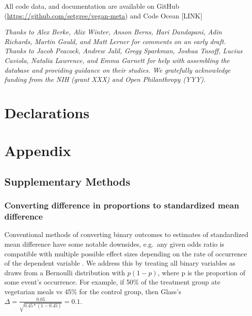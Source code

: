 \documentclass[sn-nature,pdflatex]{sn-jnl}
\begin{document}
\backmatter


All code data, and documentation are available on GitHub
(\url{https://github.com/setgree/vegan-meta}) and Code Ocean {[}LINK{]}


\emph{Thanks to Alex Berke, Alix Winter, Anson Berns, Hari Dandapani,
Adin Richards, Martin Gould, and Matt Lerner for comments on an early
draft. Thanks to Jacob Peacock, Andrew Jalil, Gregg Sparkman, Joshua
Tasoff, Lucius Caviola, Natalia Lawrence, and Emma Garnett for help with
assembling the database and providing guidance on their studies. We
gratefully acknowledge funding from the NIH (grant XXX) and Open
Philanthropy (YYY).}

\section*{Declarations}\label{declarations}

\newpage

\section{Appendix}\label{appendix}

\subsection{Supplementary Methods}\label{supplementary-methods}

\subsubsection{Converting difference in proportions to standardized mean
difference}\label{converting-difference-in-proportions-to-standardized-mean-difference}

Conventional methods of converting binary outcomes to estimates of
standardized mean difference have some notable downsides, e.g.~any given
odds ratio is compatible with multiple possible effect sizes depending
on the rate of occurrence of the dependent variable \citep{gomila2021}.
We address this by treating all binary variables as draws from a
Bernoulli distribution with \(p(1 - p)\), where p is the proportion of
some event's occurrence. For example, if 50\% of the treatment group ate
vegetarian meals vs 45\% for the control group, then Glass's
\(\Delta = \frac{0.05}{\sqrt{0.45 * (1-0.45)}} = 0.1\).
\end{document}
